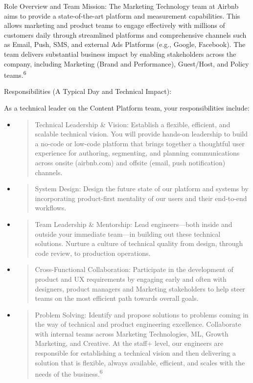 \documentclass[12pt,a4paper]{article}
\begin{document}
Role Overview and Team Mission: The Marketing Technology team at Airbnb
aims to provide a state-of-the-art platform and measurement
capabilities. This allows marketing and product teams to engage
effectively with millions of customers daily through streamlined
platforms and comprehensive channels such as Email, Push, SMS, and
external Ads Platforms (e.g., Google, Facebook). The team delivers
substantial business impact by enabling stakeholders across the company,
including Marketing (Brand and Performance), Guest/Host, and Policy
teams.\textsuperscript{6}

Responsibilities (A Typical Day and Technical Impact):

As a technical leader on the Content Platform team, your
responsibilities include:

\begin{itemize}
\item
  \begin{quote}
  Technical Leadership \& Vision: Establish a flexible, efficient, and
  scalable technical vision. You will provide hands-on leadership to
  build a no-code or low-code platform that brings together a thoughtful
  user experience for authoring, segmenting, and planning communications
  across onsite (airbnb.com) and offsite (email, push notification)
  channels.
  \end{quote}
\item
  \begin{quote}
  System Design: Design the future state of our platform and systems by
  incorporating product-first mentality of our users and their
  end-to-end workflows.
  \end{quote}
\item
  \begin{quote}
  Team Leadership \& Mentorship: Lead engineers---both inside and
  outside your immediate team---in building out these technical
  solutions. Nurture a culture of technical quality from design, through
  code review, to production operations.
  \end{quote}
\item
  \begin{quote}
  Cross-Functional Collaboration: Participate in the development of
  product and UX requirements by engaging early and often with
  designers, product managers and Marketing stakeholders to help steer
  teams on the most efficient path towards overall goals.
  \end{quote}
\item
  \begin{quote}
  Problem Solving: Identify and propose solutions to problems coming in
  the way of technical and product engineering excellence. Collaborate
  with internal teams across Marketing Technologies, ML, Growth
  Marketing, and Creative. At the staff+ level, our engineers are
  responsible for establishing a technical vision and then delivering a
  solution that is flexible, always available, efficient, and scales
  with the needs of the business.\textsuperscript{6}
  \end{quote}
\end{itemize}
\end{document}
